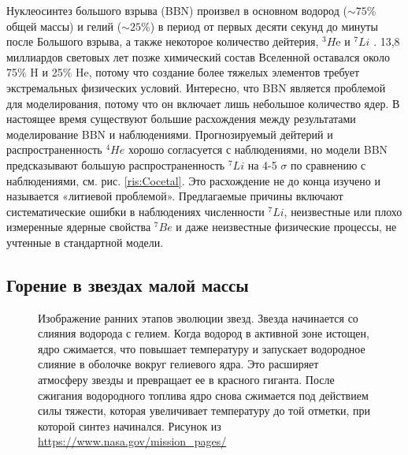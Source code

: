 \documentclass[14pt, a4paper]{article}
\numberwithin{figure}{section}
\numberwithin{equation}{section}
\begin{document}
Нуклеосинтез большого взрыва (BBN) произвел в основном водород ($\sim75\%$ общей массы) и гелий ($\sim25\%$) в период от первых десяти секунд до минуты после Большого взрыва, а также некоторое количество дейтерия, $^3H$e и $^7Li$ \cite{Tytler}. 13,8 миллиардов световых лет позже химический состав Вселенной оставался около 75$\%$ H и 25$\%$ He, потому что создание более тяжелых элементов требует экстремальных физических условий. Интересно, что BBN является проблемой для моделирования, потому что он включает лишь небольшое количество ядер. В настоящее время существуют большие расхождения между результатами моделирование BBN и наблюдениями. Прогнозируемый дейтерий и распространенность $^4He$ хорошо согласуется с наблюдениями, но модели BBN предсказывают большую распространенность $^7Li$ на 4-5 $\sigma$ по сравнению с наблюдениями, см. рис. \ref{ris:Cocetal}. Это расхождение не до конца изучено и называется «литиевой проблемой». Предлагаемые причины включают систематические ошибки в наблюдениях численности $^7Li$, неизвестные или плохо измеренные ядерные свойства $^{7}Be$ и даже неизвестные физические процессы, не учтенные в стандартной модели.

\subsection{Горение в звездах малой массы}

\begin{figure}[ht]
	\caption{Изображение ранних этапов эволюции звезд. Звезда начинается со слияния	водорода с гелием. Когда водород в активной зоне истощен, ядро сжимается, что повышает температуру и запускает водородное слияние в оболочке вокруг гелиевого ядра. Это расширяет атмосферу звезды и превращает ее в красного гиганта. После сжигания водородного топлива ядро снова сжимается под действием силы тяжести, которая увеличивает температуру до той отметки, при которой синтез начинался. Рисунок из \url{https://www.nasa.gov/mission\_pages/}}
	\label{ris:evolution}
\end{figure}
\end{document}
